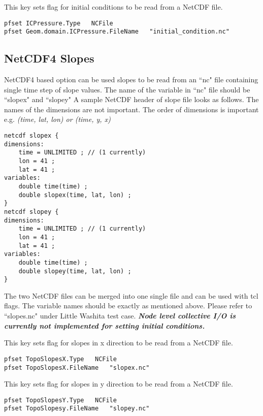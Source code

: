 {This key sets flag for initial conditions to be read from a NetCDF file.}
\begin{display}\begin{verbatim}
pfset ICPressure.Type   NCFile
pfset Geom.domain.ICPressure.FileName   "initial_condition.nc"
\end{verbatim}\end{display}

\subsection{NetCDF4 Slopes}
NetCDF4 based option can be used slopes to be read from an ``nc" file containing single time step of slope values. The name of the variable in ``nc" file should be ``slopex" and ``slopey" A sample NetCDF header of slope file looks as follows. The names of the dimensions are not important. The order of dimensions is important e.g. \textit{(time, lat, lon) or (time, y, x)}
\begin{display}\begin{verbatim}
netcdf slopex {
dimensions:
	time = UNLIMITED ; // (1 currently)
	lon = 41 ;
	lat = 41 ;
variables:
  	double time(time) ;
	double slopex(time, lat, lon) ;
}
netcdf slopey {
dimensions:
	time = UNLIMITED ; // (1 currently)
	lon = 41 ;
	lat = 41 ;
variables:
	double time(time) ;
	double slopey(time, lat, lon) ;
}
\end{verbatim}\end{display}
The two NetCDF files can be merged into one single file and can be used with tcl flags. The variable names should be exactly as mentioned above. Please refer to ``slopes.nc" under Little Washita test case.
\textit{\textbf{Node level collective I/O is currently not implemented for setting initial conditions.}}

{This key sets flag for slopes in x direction to be read from a NetCDF file.}
\begin{display}\begin{verbatim}
pfset TopoSlopesX.Type   NCFile
pfset TopoSlopesX.FileName   "slopex.nc"
\end{verbatim}\end{display}
{This key sets flag for slopes in y direction to be read from a NetCDF file.}
\begin{display}\begin{verbatim}
pfset TopoSlopesY.Type   NCFile
pfset TopoSlopesy.FileName   "slopey.nc"
\end{verbatim}\end{display}

